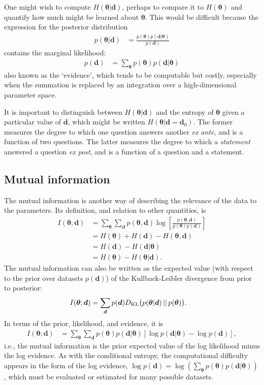 \documentclass[entropy,article,accept,oneauthor,pdftex,10pt,a4paper]{mdpi}
\renewcommand{\d}{\boldsymbol{d}}
\newcommand{\x}{\boldsymbol{\theta}}
\begin{document}
One might wish to compute $H(\x | \d)$, perhaps to compare it to
$H(\x)$ and quantify how much might be learned about $\x$.
This would be difficult because the expression
for the posterior distribution
\begin{align}
p(\x | \d) &= \frac{p(\x)p(\d | \x)}{p(\d)}
\end{align}
contains the marginal likelihood:
\begin{align}
p(\d) &= \sum_{\x} p(\x) p(\d | \x)
\end{align}
also known as the `evidence', which tends to be computable but costly,
especially when the summation is replaced by an integration over a
high-dimensional parameter space.

It is important to distinguish between $H(\x | \d)$ and the
entropy of $\x$ given a particular value of $\d$, which might be written
$H(\x | \d=\d_0)$.
The former measures the degree to which one question answers
another {\em ex ante}, and is a function of two questions.
The latter measures the degree to which a {\em statement} answered a question
{\em ex post}, and is a function of a question and a statement.

\subsection{Mutual information}

The mutual information is another way of describing the relevance of the
data to the parameters. Its definition, and relation to other quantities, is
\begin{align}
I(\x; \d) &= \sum_{\x} \sum_{\d} p(\x, \d)
                       \log\left[\frac{p(\x, \d)}{p(\x)p(\d)}\right]\\
           &= H(\x) + H(\d) - H(\x, \d)\\
           &= H(\d) - H(\d | \x)\\
           &= H(\x) - H(\x | \d).
\end{align}
The mutual information can also be written as the expected value
(with respect to the prior over datasets $p(\d)$) of the Kullback-Leibler
divergence from prior to posterior:
\begin{align}
I(\x ; \d) &= \sum_{\d} p(\d) D_{\rm KL}\big(p(\x|\d) \, || \, p(\x)\big).
\end{align}
In terms of the prior, likelihood, and evidence,
it is
\begin{align}
I(\x; \d) &= \sum_{\x} \sum_{\d} p(\x)p(\d | \x)
              \left[\log p(\d | \x) - \log p(\d)\right],
\end{align}
i.e., the mutual information is the prior expected value of the
log likelihood minus the log evidence.
As with the conditional entropy, the computational
difficulty appears in the form of the log evidence,
$\log p(\d) = \log \left(\sum_{\x} p(\x)p(\d | \x)\right)$, which must be evaluated
or estimated for many possible datasets.
\end{document}
